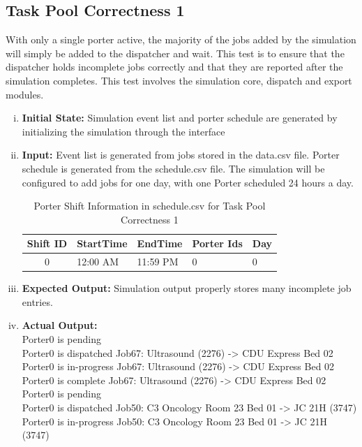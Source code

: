 \documentclass[paper=letter, fontsize=10pt]{scrartcl}
\numberwithin{equation}{section}		%
\numberwithin{figure}{section}			%
\numberwithin{table}{section}				%
\begin{document}
\subsection{Task Pool Correctness 1}
With only a single porter active, the majority of the jobs added by the simulation will simply be added to the dispatcher and wait. This test is to ensure that the dispatcher holds incomplete jobs correctly and that they are reported after the simulation completes. This test involves the simulation core, dispatch and export modules.
\begin{enumerate}[(i)]
	\item \textbf{Initial State:} Simulation event list and porter schedule are generated by initializing the simulation through the interface
	\item \textbf{Input:} Event list is generated from jobs stored in the data.csv file. Porter schedule is generated from the schedule.csv file. The simulation will be configured to add jobs for one day, with one Porter scheduled 24 hours a day.
	\begin{table}
	\caption{Porter Shift Information in schedule.csv for Task Pool Correctness 1}
	\begin{center}
    	\begin{tabular}{| c | l | l | l | l |}
    		\hline
        	Shift ID & StartTime & EndTime & Porter Ids & Day \\ \hline
  			0 & 12:00 AM & 11:59 PM & 0 & 0 \\ \hline
    	\end{tabular}
	\end{center}
	\end{table}
	\item \textbf{Expected Output:} Simulation output properly stores many incomplete job entries.
	\item \textbf{Actual Output:} \\
Porter0 is pending\\
Porter0 is dispatched Job67: Ultrasound (2276) -> CDU Express Bed 02\\
Porter0 is in-progress Job67: Ultrasound (2276) -> CDU Express Bed 02\\
Porter0 is complete Job67: Ultrasound (2276) -> CDU Express Bed 02\\
Porter0 is pending\\
Porter0 is dispatched Job50: C3 Oncology Room 23 Bed 01 -> JC 21H (3747)\\
Porter0 is in-progress Job50: C3 Oncology Room 23 Bed 01 -> JC 21H (3747)\\

\end{enumerate}
\end{document}
